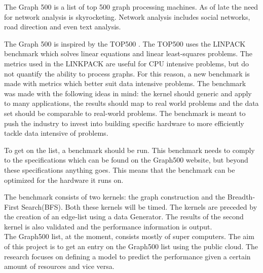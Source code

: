 The Graph 500 \cite{murphy2010introducing} is a list of top 500 graph processing machines. As of late the need for network analysis is skyrocketing. Network analysis includes social networks, road direction and even text analysis. 

The Graph 500 is inspired by the TOP500 \cite{top500}. The TOP500 uses the LINPACK benchmark which solves linear equations and linear least-squares problems. The metrics used in the LINKPACK are useful for CPU intensive problems, but do not quantify the ability to process graphs. For this reason, a new benchmark is made with metrics which better suit data intensive problems. The benchmark was made with the following ideas in mind: the kernel should generic and apply to many applications, the results should map to real world problems and the data set should be comparable to real-world problems. The benchmark is meant to push the industry to invest into building specific hardware to more efficiently tackle data intensive of problems.


To get on the list, a benchmark should be run. This benchmark needs to comply to the specifications which can be found on the Graph500 website\cite{graph500-specs}, but beyond these specifications anything goes. This means that the benchmark can be optimized for the hardware it runs on. 

The benchmark consists of two kernels: the graph construction and the Breadth-First Search(BFS). Both these kernels will be timed. The kernels are preceded by the creation of an edge-list using a data Generator. The results of the second kernel is also validated and the performance information is output.
\\
The Graph500 list, at the moment, consists mostly of super computers. The aim of this project is to get an entry on the Graph500 list using the public cloud. The research focuses on defining a model to predict the performance given a certain amount of resources and vice versa.
